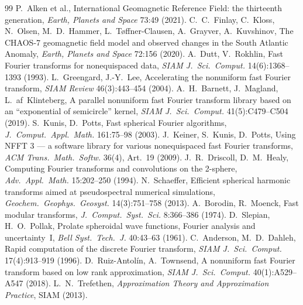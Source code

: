\documentclass[11pt,a4paper]{article}
\theoremstyle{remark}
\begin{document}
\begin{thebibliography}{99}\small
{} P.~Alken et al., International Geomagnetic Reference Field: the thirteenth generation, \emph{Earth, Planets and Space} 73:49 (2021).
 C.~C.~Finlay, C.~Kloss, N.~Olsen, M.~D.~Hammer, L.~T\o ffner-Clausen, A.~Grayver, A.~Kuvshinov, The CHAOS-7 geomagnetic field model and observed changes in the South Atlantic Anomaly, \emph{Earth, Planets and Space} 72:156 (2020).
 A.~Dutt, V.~Rokhlin, Fast Fourier transforms for nonequispaced data, \emph{SIAM J.\ Sci.\ Comput.} 14(6):1368--1393 (1993).
 L.~Greengard, J.-Y.~Lee, Accelerating the nonuniform fast Fourier transform, \emph{SIAM Review} 46(3):443--454 (2004).
 A.~H.~Barnett, J.~Magland, L.~af~Klinteberg, A parallel nonuniform fast Fourier transform library based on an ``exponential of semicircle'' kernel, \emph{SIAM J.\ Sci.\ Comput.} 41(5):C479--C504 (2019).
 S.~Kunis, D.~Potts, Fast spherical Fourier algorithms, \emph{J.\ Comput.\ Appl.\ Math.} 161:75--98 (2003).
 J.~Keiner, S.~Kunis, D.~Potts, Using NFFT 3 --- a software library for various nonequispaced fast Fourier transforms, \emph{ACM Trans.\ Math.\ Softw.} 36(4), Art.~19 (2009).
 J.~R.~Driscoll, D.~M.~Healy, Computing Fourier transforms and convolutions on the 2-sphere, \emph{Adv.\ Appl.\ Math.} 15:202--250 (1994).
 N.~Schaeffer, Efficient spherical harmonic transforms aimed at pseudospectral numerical simulations, \emph{Geochem.\ Geophys.\ Geosyst.} 14(3):751--758 (2013).
 A.~Borodin, R.~Moenck, Fast modular transforms, \emph{J.\ Comput.\ Syst.\ Sci.} 8:366--386 (1974).
 D.~Slepian, H.~O.~Pollak, Prolate spheroidal wave functions, Fourier analysis and uncertainty~I, \emph{Bell Syst.\ Tech.\ J.} 40:43--63 (1961).
 C.~Anderson, M.~D.~Dahleh, Rapid computation of the discrete Fourier transform, \emph{SIAM J.\ Sci.\ Comput.} 17(4):913--919 (1996).
 D.~Ruiz-Antol\'in, A.~Townsend, A nonuniform fast Fourier transform based on low rank approximation, \emph{SIAM J.\ Sci.\ Comput.} 40(1):A529--A547 (2018).
 L.~N.~Trefethen, \emph{Approximation Theory and Approximation Practice}, SIAM (2013).
\end{thebibliography}
\end{document}

